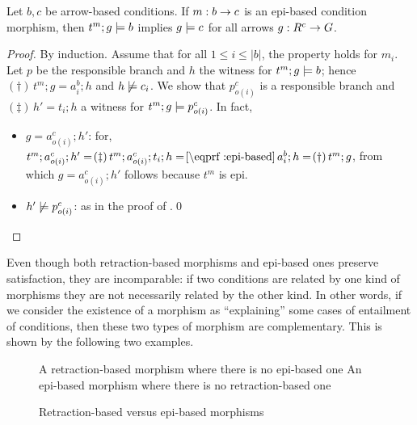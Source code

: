 \begin{proposition}
  Let $b,c$ be arrow-based conditions. If $m:b\rightarrow c$ is an epi-based condition morphism, then $t^m;g\models b$ implies $g \models c$ for all arrows $g:R^c\rightarrow G$.
\end{proposition}
%
\begin{proof}
By induction. Assume that for all $1\leq i\leq |b|$, the property holds for $m_i$. Let $p$ be the responsible branch and $h$ the witness for $t^m;g\models b$; hence $(\dagger)\, t^m;g=a^b_i;h$ and $h\not\models c_i$. We show that $p^c_{o(i)}$ is a responsible branch and $(\ddagger)\, h'=t_i;h$ a witness for $t^m;g\models p^c_{o(i)}$. In fact, 
  \begin{itemize}
  \item $g = a^c_{o(i)};h'$: for, $t^m;a^c_{o(i)};h' =\!(\ddagger)\, t^m;a^c_{o(i)};t_i;h =\!\eqcite{epi-based}\, a^b_i; h =\!(\dagger)\, t^m;g$, from which  $g = a^c_{o(i)};h'$ follows because $t^m$ is epi. 
  \item $h'\not\models p^c_{o(i)}$: as in the proof of .\qed
  \end{itemize}
\end{proof}
%
Even though both retraction-based morphisms and epi-based ones preserve satisfaction, they are incomparable: if two conditions are related by one kind of morphisms they are not necessarily related by the other kind. In other words, if we consider the existence of a morphism as ``explaining'' some cases of entailment of conditions, then these two types of morphism are complementary. This is shown by the following two examples.
%
\begin{figure}
\centering
\subcaptionbox
  {A retraction-based morphism where there is no epi-based one
  }
  {}
  \qquad
\subcaptionbox
  {An epi-based morphism where there is no retraction-based one
  }
  {}
\caption{Retraction-based versus epi-based morphisms}
\end{figure}
%
